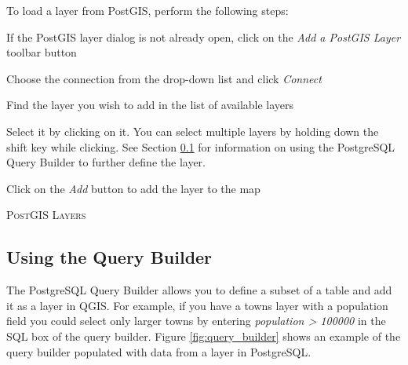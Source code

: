 To load a layer from PostGIS, perform the following steps:
\begin{compactenum}
\item If the PostGIS layer dialog is not already open, click on the \textit{Add a PostGIS Layer} toolbar button
\item Choose the connection from the drop-down list and click \textsl{Connect}
\item Find the layer you wish to add in the list of available layers
\item Select it by clicking on it. You can select multiple layers by holding down the shift key while clicking. See Section \ref{sec:query_builder} for information on using the PostgreSQL Query Builder to further define the layer.
\item Click on the \textsl{Add} button to add the layer to the map
\end{compactenum}
\begin{Tip}\caption{\textsc{PostGIS Layers}}
\end{Tip}
\subsection{Using the Query
Builder}\label{sec:query_builder}
The PostgreSQL Query Builder allows you to define a subset of a table and add it
as a layer in QGIS.  For example, if you have a towns layer with a population
field you could select only larger towns by entering \textsl{population >
100000} in the SQL box of the query builder. Figure \ref{fig:query_builder} shows an
example of the query builder populated with data from a layer in PostgreSQL. 

